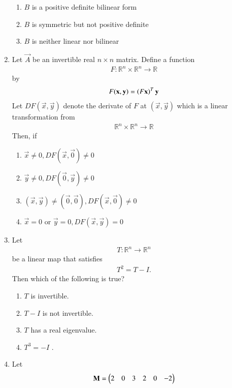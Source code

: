 \begin{enumerate}[label=\thesection.\arabic*.,ref=\thesection.\theenumi]
\begin{enumerate}
\item $B$ is a positive definite bilinear form
\item $B$ is symmetric but not positive definite
\item $B$ is neither linear nor bilinear
\end{enumerate}  
%
\item Let $\vec{A}$ be an invertible real $n \times n$ matrix.  Define a function
\begin{align}
F: \mathbb{R}^n \times \mathbb{R}^n \to \mathbb{R}
\end{align}
by 
\begin{align}
F(\mathbf{x},\mathbf{y}) = \left(F\mathbf{x}\right)^T\mathbf{y}
\end{align}
Let $DF(\vec{x},\vec{y}) $ denote the derivate of $F$ at $(\vec{x},\vec{y}) $ which is 
a linear transformation from 
\begin{align}
\mathbb{R}^n \times \mathbb{R}^n \to \mathbb{R}
\end{align}
%
Then, if 
\begin{enumerate}
\item $\vec{x} \ne 0, DF(\vec{x},\vec{0}) \ne 0$ 
\item $\vec{y} \ne 0, DF(\vec{0},\vec{y}) \ne 0$ 
\item $(\vec{x},\vec{y}) \ne (\vec{0},\vec{0}), DF(\vec{x},\vec{0}) \ne 0$ 
\item $\vec{x} = 0$ or  $\vec{y} = 0, DF(\vec{x},\vec{y}) = 0$ 
\end{enumerate}  
%
\solution

%
\item Let
\begin{align}
T: \mathbb{R}^n \to \mathbb{R}^n
\end{align}
%
be a linear map that satisfies 
\begin{align}
T^2 = T-I.
\end{align}
Then which of the following is true?
\begin{enumerate}
\item $T$ is invertible. 
\item $T-I$ is not invertible. 
\item $T$ has a real eigenvalue. 
\item $T^3 = -I$ . 
\end{enumerate}
%
\solution

\item Let
\begin{align}
\mathbf{M} = 
\begin{pmatrix}
2 & 0 & 3 & 2 & 0 & -2
\\
\end{pmatrix}
\end{align}
\end{enumerate}

